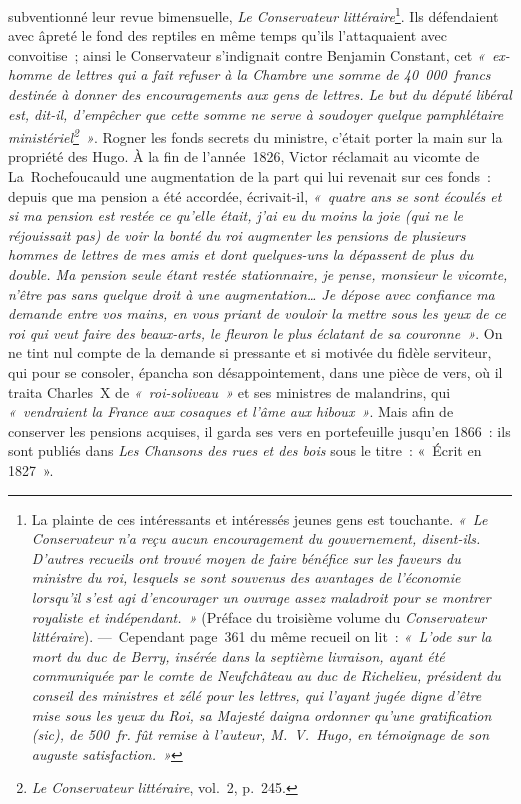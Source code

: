 \documentclass[french,twoside]{book} %
\begin{document}
\label{p12}subventionné leur revue bimensuelle, \emph{Le Conservateur littéraire}\footnote{La plainte de ces intéressants et intéressés jeunes gens est touchante. \emph{« Le \emph{Conservateur} n’a reçu aucun encouragement du gouvernement, disent-ils. D’autres recueils ont trouvé moyen de faire bénéfice sur les faveurs du ministre du roi, lesquels se sont souvenus des avantages de l’économie lorsqu’il s’est agi d’encourager un ouvrage assez maladroit pour se montrer royaliste et indépendant. »} (Préface du troisième volume du \emph{Conservateur littéraire}). — Cependant page 361 du même recueil on lit : \emph{« L’ode sur \emph{la mort du duc de Berry}, insérée dans la septième livraison, ayant été communiquée par le comte de Neufchâteau au duc de Richelieu, président du conseil des ministres et zélé pour les lettres, qui l’ayant jugée digne d’être mise sous les yeux du Roi, sa Majesté daigna ordonner qu’une gratification ({\itshape sic}), de 500 fr. fût remise à l’auteur, M. V. Hugo, en témoignage de son auguste satisfaction. »}}. Ils défendaient avec âpreté le fond des reptiles en même temps qu’ils l’attaquaient avec convoitise ; ainsi le Conservateur s’indignait contre Benjamin Constant, cet \emph{« ex-homme de lettres qui a fait refuser à la Chambre une somme de 40 000 francs destinée à donner des encouragements aux gens de lettres. Le but du député libéral est, dit-il, d’empêcher que cette somme ne serve à soudoyer quelque pamphlétaire ministériel\footnote{\emph{Le Conservateur littéraire}, vol. 2, p. 245.} »}. Rogner les fonds secrets du ministre, c’était porter la main sur la propriété des Hugo. À la fin de l’année 1826, Victor réclamait au vicomte de La Rochefoucauld une augmentation de la part qui lui revenait sur ces fonds : depuis que ma pension a été accordée, écrivait-il, \emph{« quatre ans se sont écoulés et si ma pension est restée ce qu’elle était, j’ai eu du moins la joie (qui ne le réjouissait pas) de voir la bonté du roi augmenter les pensions de plusieurs hommes de lettres de mes amis et dont quelques-uns la dépassent de plus du double. Ma pension seule  
\label{p13}étant restée stationnaire, je pense, monsieur le vicomte, n’être pas sans quelque droit à une augmentation… Je dépose avec confiance ma demande entre vos mains, en vous priant de vouloir la mettre sous les yeux de ce roi qui veut faire des beaux-arts, le fleuron le plus éclatant de sa couronne »}. On ne tint nul compte de la demande si pressante et si motivée du fidèle serviteur, qui pour se consoler, épancha son désappointement, dans une pièce de vers, où il traita Charles X de \emph{« roi-soliveau »} et ses ministres de malandrins, qui \emph{« vendraient la France aux cosaques et l’âme aux hiboux »}. Mais afin de conserver les pensions acquises, il garda ses vers en portefeuille jusqu’en 1866 : ils sont publiés dans \emph{Les Chansons des rues et des bois} sous le titre : « Écrit en 1827 ».\par
\end{document}
